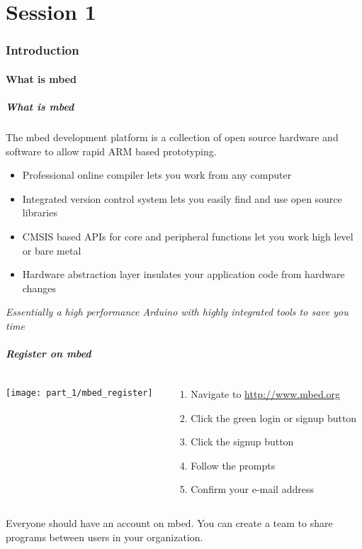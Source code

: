 \part{Session 1}
\lstset{language=C++}

\section{Introduction}
\subsection{What is mbed}
\begin{frame}
	\frametitle{What is mbed}
	The mbed development platform is a collection of open source hardware and software to allow rapid ARM based prototyping.
	\begin{itemize}
		\item Professional online compiler lets you work from any computer
		\item Integrated version control system lets you easily find and use open source libraries
		\item CMSIS based APIs for core and peripheral functions let you work high level or bare metal
		\item Hardware abstraction layer insulates your application code from hardware changes
	\end{itemize}
	\textit{Essentially a high performance Arduino with highly integrated tools to save you time}
\end{frame}

\begin{frame}
	\frametitle{Register on mbed}
	\begin{columns}[c]
		\begin{column}{0.5\textwidth}
			\texttt{[image: part\_1/mbed\_register]}
		\end{column}
		\begin{column}{0.5\textwidth}
			\begin{enumerate}
				\item Navigate to \url{http://www.mbed.org}
				\item Click the green login or signup button
				\item Click the signup button
				\item Follow the prompts
				\item Confirm your e-mail address
			\end{enumerate}
		\end{column}
	\end{columns}
	\vspace{1ex}
	Everyone should have an account on mbed.
	You can create a team to share programs between users in your organization.
\end{frame}

